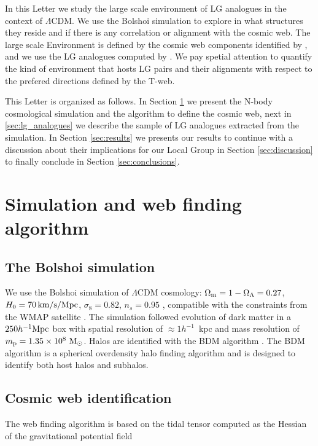 \documentclass{emulateapj}
\newcommand{\hmpc}{{\ifmmode{h^{-1}{\rm Mpc}}\else{$h^{-1}$Mpc }\fi}}
\begin{document}
In this Letter we study the large scale environment of LG 
analogues in the context of $\Lambda$CDM. We use the Bolshoi
simulation to explore in what structures they reside and if there is
any correlation or alignment with the cosmic web. The large scale
Environment is defined by the cosmic web components identified by
\citet{Tweb}, and we use the LG analogues computed by
\citet{lganalogues}. We pay spetial attention to quantify the kind of
environment that hosts LG pairs and their alignments with respect to
the prefered directions defined by the T-web. 
   
This Letter is organized as follows. In Section \ref{sec:simulation}
we present the N-body cosmological simulation and the algorithm to
define the cosmic web, next in \ref{sec:lg_analogues} we describe the
sample of LG analogues extracted from the simulation. In
Section \ref{sec:results} we presents our results to continue with a
discussion about their implications for our Local Group in Section
\ref{sec:discussion} to finally conclude in Section
\ref{sec:conclusions}. 


\section{Simulation and web finding algorithm}
\label{sec:simulation}

\subsection{The Bolshoi simulation}
We use the Bolshoi simulation of $\Lambda$CDM cosmology: $\Omega_{\rm
  m}=1-\Omega_{\Lambda}=0.27$, $H_0=70\,\rm km/s/Mpc$,
$\sigma_8=0.82$, $n_s=0.95$ \citep{2011ApJ...740..102K}, compatible
with the constraints from the WMAP satellite
\citep{hinshaw_etal13}. The simulation followed evolution of dark
matter in a $250 \hmpc$ box with spatial resolution of $\approx
1h^{-1}$~kpc and mass resolution of $m_{\rm p}=1.35\times 10^8\ \rm
M_{\odot}$. Halos are identified with the BDM algorithm
\citep{1997astro.ph.12217K}. The BDM algorithm is  a spherical
overdensity halo finding algorithm and is designed to identify both
host halos and subhalos. 


\subsection{Cosmic web identification}
The web finding algorithm is based on the tidal tensor computed as the
Hessian of the  gravitational potential field
\end{document}
